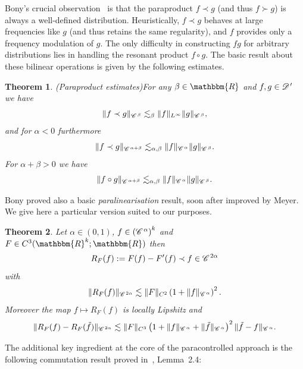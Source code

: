 \documentclass{amsart}
\newcommand{\assign}{:=}
\newcommand{\tmtextit}[1]{{\itshape{#1}}}
\newtheorem{theorem}{Theorem}
\theoremstyle{remark}
\theoremstyle{definition}
\newcommand{\CC}{\mathscr{C} \hspace{.1em}}
\newcommand{\CD}{\mathscr{D} \hspace{.1em}}
\begin{document}
Bony's crucial observation~{\cite{Bony1981,meyer_remarques_1981}} is that the
paraproduct $f \prec g$ (and thus $f \succ g$) is always a well-defined
distribution. Heuristically, $f \prec g$ behaves at large frequencies like $g$
(and thus retains the same regularity), and $f$ provides only a frequency
modulation of $g$. The only difficulty in constructing $fg$ for arbitrary
distributions lies in handling the resonant product $f \circ g$. The basic
result about these bilinear operations is given by the following estimates.

\begin{theorem}
  (Paraproduct estimates)\label{thm:paraproduct} For any $\beta \in
  \mathbbm{R}$ and $f, g \in \CD'$ we have
  \begin{equation}
    \label{eq:para-1} \|f \prec g\|_{\CC^{\beta}} \lesssim_{\beta}
    \|f\|_{L^{\infty}} \|g\|_{\CC^{\beta}},
  \end{equation}
  and for $\alpha < 0$ furthermore
  \begin{equation}
    \label{eq:para-2} \|f \prec g\|_{\CC^{\alpha + \beta}} \lesssim_{\alpha,
    \beta} \|f\|_{\CC^{\alpha}} \|g\|_{\CC^{\beta}} .
  \end{equation}
  For $\alpha + \beta > 0$ we have
  \begin{equation}
    \label{eq:para-3} \|f \circ g\|_{\CC^{\alpha + \beta}} \lesssim_{\alpha,
    \beta} \|f\|_{\CC^{\alpha}} \|g\|_{\CC^{\beta}} .
  \end{equation}
\end{theorem}

Bony proved also a basic \tmtextit{paralinearisation} result, soon after
improved by Meyer. We give here a particular version suited to our purposes.

\begin{theorem}
  \label{th:paralinearisation}Let $\alpha \in (0, 1)$, $f \in \left(
  \CC^{\alpha} \right)^k$ and $F \in C^3 (\mathbbm{R}^k ; \mathbbm{R})$ then
  \[ R_F (f) \assign F (f) - F' (f) \prec f \in \CC^{2 \alpha} \]
  with
  \[ \| R_F (f) \|_{\CC^{2 \alpha}} \lesssim \| F \|_{C^2} \left( 1 + \| f
     \|_{\CC^{\alpha}} \right)^2 . \]
  Moreover the map $f \mapsto R_F (f)$ is locally Lipshitz and
  \[ \| R_F (f) - R_F (\tilde{f}) \|_{\CC^{2 \alpha}} \lesssim \| F \|_{C^3}
     \left( 1 + \| f \|_{\CC^{\alpha}} + \| \tilde{f} \|_{\CC^{\alpha}}
     \right)^2 \| \tilde{f} - f \|_{\CC^{\alpha}} . \]
\end{theorem}

The additional key ingredient at the core of the paracontrolled approach is
the following commutation result proved
in~{\cite{gubinelli_paracontrolled_2015}}, Lemma~2.4:
\end{document}
